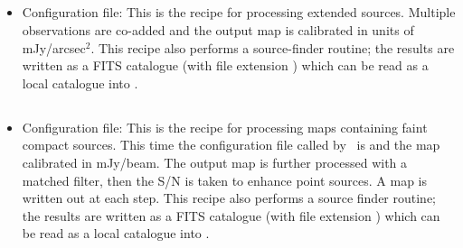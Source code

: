 \documentclass[11pt,oneside,chapters]{starlink}
\begin{document}
\subsection{}
\begin{itemize}
\item  Configuration file: 
\newline\newline
This is the recipe for processing extended sources. Multiple observations
are co-added and the output
map is calibrated in units of mJy/arcsec$^2$. This recipe also
performs a source-finder routine; the results are written as a FITS
catalogue (with file extension ) which can be read as a
local catalogue into \gaia.
\end{itemize}

\subsection{}
\begin{itemize}
\item  Configuration file: 
\newline\newline
This is the recipe for processing maps containing faint compact
sources. This time the configuration file called by \makemap\
is  and the map calibrated in mJy/beam.
The output map is further processed with a matched filter, then the
S/N is taken to enhance point sources.  A map is written out at each step.
This recipe also performs a source finder routine; the results are written
as a FITS catalogue (with file extension \file{.FIT}) which can be
read as a local catalogue into \gaia.
\end{itemize}
\end{document}
